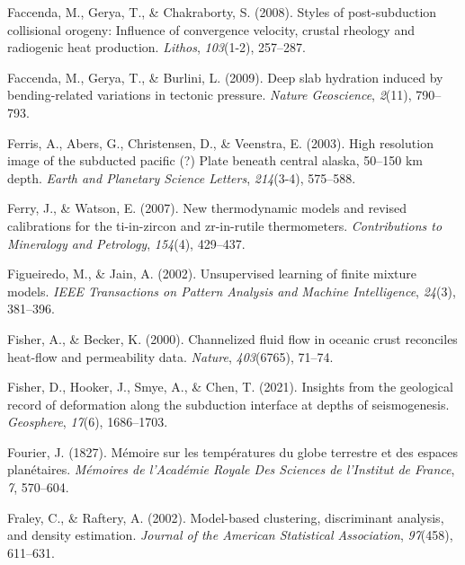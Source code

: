 \begin{CSLReferences}{1}{1}
\leavevmode{}%
Faccenda, M., Gerya, T., \& Chakraborty, S. (2008). Styles of post-subduction collisional orogeny: Influence of convergence velocity, crustal rheology and radiogenic heat production. \emph{Lithos}, \emph{103}(1-2), 257--287.

\leavevmode{}%
Faccenda, M., Gerya, T., \& Burlini, L. (2009). Deep slab hydration induced by bending-related variations in tectonic pressure. \emph{Nature Geoscience}, \emph{2}(11), 790--793.

\leavevmode{}%
Ferris, A., Abers, G., Christensen, D., \& Veenstra, E. (2003). High resolution image of the subducted pacific (?) Plate beneath central alaska, 50--150 km depth. \emph{Earth and Planetary Science Letters}, \emph{214}(3-4), 575--588.

\leavevmode{}%
Ferry, J., \& Watson, E. (2007). New thermodynamic models and revised calibrations for the ti-in-zircon and zr-in-rutile thermometers. \emph{Contributions to Mineralogy and Petrology}, \emph{154}(4), 429--437.

\leavevmode{}%
Figueiredo, M., \& Jain, A. (2002). Unsupervised learning of finite mixture models. \emph{IEEE Transactions on Pattern Analysis and Machine Intelligence}, \emph{24}(3), 381--396.

\leavevmode{}%
Fisher, A., \& Becker, K. (2000). Channelized fluid flow in oceanic crust reconciles heat-flow and permeability data. \emph{Nature}, \emph{403}(6765), 71--74.

\leavevmode{}%
Fisher, D., Hooker, J., Smye, A., \& Chen, T. (2021). Insights from the geological record of deformation along the subduction interface at depths of seismogenesis. \emph{Geosphere}, \emph{17}(6), 1686--1703.

\leavevmode{}%
Fourier, J. (1827). Mémoire sur les températures du globe terrestre et des espaces planétaires. \emph{Mémoires de l'Académie Royale Des Sciences de l'Institut de France}, \emph{7}, 570--604.

\leavevmode{}%
Fraley, C., \& Raftery, A. (2002). Model-based clustering, discriminant analysis, and density estimation. \emph{Journal of the American Statistical Association}, \emph{97}(458), 611--631.


\end{CSLReferences}

